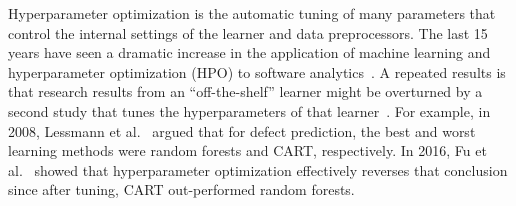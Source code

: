 \documentclass[10pt,compsoc,twocolumn]{IEEEtran}
\begin{document}
Hyperparameter optimization  is
the automatic tuning
of many parameters that control the internal settings of the learner and data preprocessors.
The last 15 years have seen a dramatic
increase in the application of machine learning and hyperparameter optimization (HPO)
 to software analytics~\cite{menzies2003data,last2003data,moeyersoms2015comprehensible,menzies2018software,kim2016emerging,menzies2006data,robillard2009recommendation,hassan2008road}.
A repeated results is that 
research results    from an ``off-the-shelf'' learner might be overturned by a second study that
tunes the hyperparameters of that learner~\cite{agrawal2019dodge}.  For example, in 2008, Lessmann et al.~\cite{Lessmann08} argued that for defect prediction, the best and worst learning methods were random forests and CART, respectively.
In 2016, Fu et al.~\cite{fu2016tuning} showed that hyperparameter optimization effectively
reverses that conclusion since  after tuning,
CART   out-performed random forests.
\end{document}
